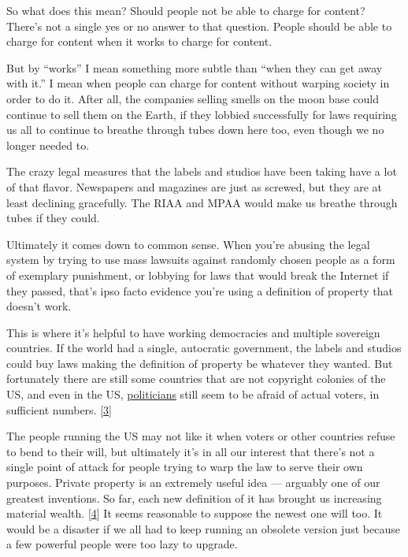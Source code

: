 So what does this mean? Should people not be able to charge for content?
There's not a single yes or no answer to that question. People should be
able to charge for content when it works to charge for content.

But by ``works'' I mean something more subtle than ``when they can get
away with it.'' I mean when people can charge for content without
warping society in order to do it. After all, the companies selling
smells on the moon base could continue to sell them on the Earth, if
they lobbied successfully for laws requiring us all to continue to
breathe through tubes down here too, even though we no longer needed to.

The crazy legal measures that the labels and studios have been taking
have a lot of that flavor. Newspapers and magazines are just as screwed,
but they are at least declining gracefully. The RIAA and MPAA would make
us breathe through tubes if they could.

Ultimately it comes down to common sense. When you're abusing the legal
system by trying to use mass lawsuits against randomly chosen people as
a form of exemplary punishment, or lobbying for laws that would break
the Internet if they passed, that's ipso facto evidence you're using a
definition of property that doesn't work.

This is where it's helpful to have working democracies and multiple
sovereign countries. If the world had a single, autocratic government,
the labels and studios could buy laws making the definition of property
be whatever they wanted. But fortunately there are still some countries
that are not copyright colonies of the US, and even in the US,
\href{http://tctechcrunch2011.files.wordpress.com/2012/01/congress-on-sopa-done.png}{politicians}
still seem to be afraid of actual voters, in sufficient numbers.
{[}\hyperref[f3n]{3}{]}

The people running the US may not like it when voters or other countries
refuse to bend to their will, but ultimately it's in all our interest
that there's not a single point of attack for people trying to warp the
law to serve their own purposes. Private property is an extremely useful
idea --- arguably one of our greatest inventions. So far, each new
definition of it has brought us increasing material wealth.
{[}\hyperref[f4n]{4}{]} It seems reasonable to suppose the newest one
will too. It would be a disaster if we all had to keep running an
obsolete version just because a few powerful people were too lazy to
upgrade.

